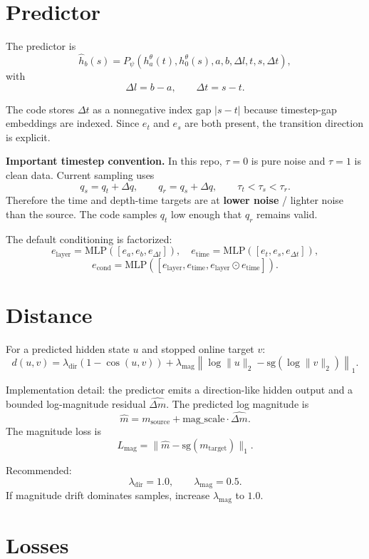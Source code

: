 \documentclass[11pt]{article}
\begin{document}
\section{Predictor}

The predictor is
\[
\widehat h_b(s)
=
P_\psi(h_a^\theta(t), h_0^\theta(s), a,b,\Delta l,t,s,\Delta t),
\]
with
\[
\Delta l=b-a,\qquad \Delta t=s-t.
\]

The code stores $\Delta t$ as a nonnegative index gap $|s-t|$ because timestep-gap
embeddings are indexed. Since $e_t$ and $e_s$ are both present, the transition
direction is explicit.

\textbf{Important timestep convention.} In this repo, \(\tau=0\) is pure noise
and \(\tau=1\) is clean data. Current sampling uses
\[
q_s = q_t + \Delta q,\qquad q_r=q_s+\Delta q,\qquad \tau_t < \tau_s < \tau_r.
\]
Therefore the time and depth-time targets are at \textbf{lower noise} / lighter
noise than the source. The code samples \(q_t\) low enough that \(q_r\) remains
valid.

The default conditioning is factorized:
\[
e_{\mathrm{layer}}=\mathrm{MLP}([e_a,e_b,e_{\Delta l}]),\quad
e_{\mathrm{time}}=\mathrm{MLP}([e_t,e_s,e_{\Delta t}]),
\]
\[
e_{\mathrm{cond}}=\mathrm{MLP}([e_{\mathrm{layer}},e_{\mathrm{time}},e_{\mathrm{layer}}\odot e_{\mathrm{time}}]).
\]

\section{Distance}

For a predicted hidden state $u$ and stopped online target $v$:
\[
d(u,v)
=
\lambda_{\mathrm{dir}}
\left(1-\cos(u,v)\right)
+
\lambda_{\mathrm{mag}}
\left\|
\log \|u\|_2
-
\mathrm{sg}(\log \|v\|_2)
\right\|_1.
\]

Implementation detail: the predictor emits a direction-like hidden output and a
bounded log-magnitude residual $\widehat{\Delta m}$. The predicted log magnitude is
\[
\widehat m = m_{\mathrm{source}} + \mathrm{mag\_scale}\cdot \widehat{\Delta m}.
\]
The magnitude loss is
\[
L_{\mathrm{mag}}
=
\|\widehat m-\mathrm{sg}(m_{\mathrm{target}})\|_1.
\]

Recommended:
\[
\lambda_{\mathrm{dir}}=1.0,\qquad \lambda_{\mathrm{mag}}=0.5.
\]
If magnitude drift dominates samples, increase \(\lambda_{\mathrm{mag}}\) to \(1.0\).

\section{Losses}
\end{document}
